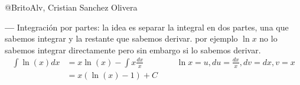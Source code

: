 \documentclass[14pt]{extarticle}
\begin{document}
\begin{center}
      @BritoAlv, Cristian Sanchez Olivera
\end{center}

    \textbf{---}   Integración por partes: la idea es separar la integral en dos partes, una que sabemos integrar y la restante que sabemos derivar. por ejemplo $\ln x$ no lo sabemos integrar directamente pero sin embargo si lo sabemos derivar.
            \begin{align}
                  \int \ln(x)dx
                   & = x\ln(x) - \int x \frac{dx}{x} &  & \text{    $\ln x = u, du = \frac{dx}{x}, dv = dx, v = x$} \\
                   & = x(\ln(x)-1) + C                                                                              \\
            \end{align}
\end{document}

